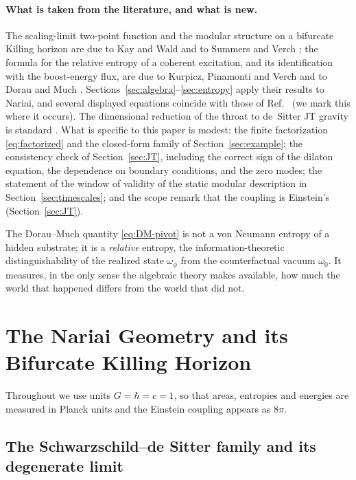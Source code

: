 \documentclass[11pt]{article}
\newcommand{\Nariai}{Nariai}
\begin{document}
\paragraph{What is taken from the literature, and what is new.} The scaling-limit two-point function and the modular structure on a bifurcate Killing horizon are due to Kay and Wald \cite{KayWald} and to Summers and Verch \cite{SummersVerch}; the formula for the relative entropy of a coherent excitation, and its identification with the boost-energy flux, are due to Kurpicz, Pinamonti and Verch \cite{KPV} and to Dorau and Much \cite{DorauMuch}. Sections~\ref{sec:algebra}--\ref{sec:entropy} apply their results to \Nariai{}, and several displayed equations coincide with those of Ref.~\cite{DorauMuch} (we mark this where it occurs). The dimensional reduction of the throat to de~Sitter JT gravity is standard \cite{MertensTuriaci}. What is specific to this paper is modest: the finite factorization \eqref{eq:factorized} and the closed-form family of Section~\ref{sec:example}; the consistency check of Section~\ref{sec:JT}, including the correct sign of the dilaton equation, the dependence on boundary conditions, and the zero modes; the statement of the window of validity of the static modular description in Section~\ref{sec:timescales}; and the scope remark that the coupling is Einstein's (Section~\ref{sec:JT}).

The Dorau--Much quantity \eqref{eq:DM-pivot} is not a von Neumann entropy of a hidden substrate; it is a \emph{relative} entropy, the information-theoretic distinguishability of the realized state $\omega_\phi$ from the counterfactual vacuum $\omega_0$. It measures, in the only sense the algebraic theory makes available, how
much the world that happened differs from the world that did not.


\section{The \Nariai{} Geometry and its Bifurcate Killing Horizon}
\label{sec:geometry}

Throughout we use units $G = \hbar = c = 1$, so that areas, entropies and energies are measured in Planck units and the Einstein coupling appears as $8\pi$.

\subsection{The Schwarzschild--de Sitter family and its degenerate limit}
\end{document}
